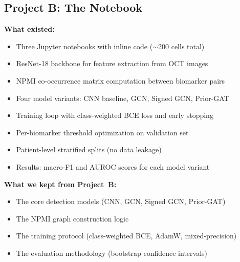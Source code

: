 \documentclass[12pt,a4paper]{article}
\begin{document}
\subsection{Project B: The Notebook}

\textbf{What existed:}
\begin{itemize}[nosep]
  \item Three Jupyter notebooks with inline code ($\sim$200 cells total)
  \item ResNet-18 backbone for feature extraction from OCT images
  \item NPMI co-occurrence matrix computation between biomarker pairs
  \item Four model variants: CNN baseline, GCN, Signed GCN, Prior-GAT
  \item Training loop with class-weighted BCE loss and early stopping
  \item Per-biomarker threshold optimization on validation set
  \item Patient-level stratified splits (no data leakage)
  \item Results: macro-F1 and AUROC scores for each model variant
\end{itemize}

\textbf{What we kept from Project~B:}
\begin{itemize}[nosep]
  \item The core detection models (CNN, GCN, Signed GCN, Prior-GAT)
  \item The NPMI graph construction logic
  \item The training protocol (class-weighted BCE, AdamW, mixed-precision)
  \item The evaluation methodology (bootstrap confidence intervals)
\end{itemize}
\end{document}
